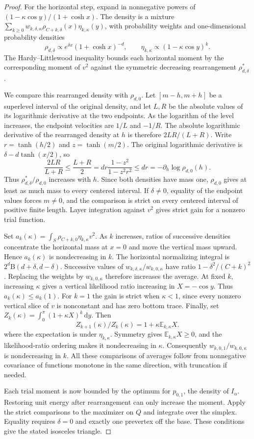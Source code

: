 \documentclass[11pt,a4paper,reqno]{amsart}
\theoremstyle{remark}
\numberwithin{equation}{section}
\newcommand{\dd}{\,\mathrm d}
\begin{document}
\begin{proof}
For the horizontal step, expand in nonnegative powers of
$(1-\kappa\cos y)/(1+\cosh x)$. The density is a mixture
$\sum_{k\ge0}w_{k,\delta,\kappa}\rho_{C+k,\delta}(x)\eta_{k,\kappa}(y)$,
with probability weights and one-dimensional probability densities
\[
 \rho_{d,\delta}\propto e^{\delta x}(1+\cosh x)^{-d},\qquad
 \eta_{k,\kappa}\propto(1-\kappa\cos y)^k .
\]
The Hardy--Littlewood inequality bounds each horizontal moment by the
corresponding moment of $v^2$ against the symmetric decreasing rearrangement
$\rho_{d,\delta}^*$.

We compare this rearranged density with $\rho_{d,0}$. Let $[m-h,m+h]$ be a
superlevel interval of the original density, and let $L,R$ be the absolute
values of its logarithmic derivative at the two endpoints. As the logarithm
of the level increases, the endpoint velocities are $1/L$ and $-1/R$.
The absolute logarithmic derivative of the rearranged density at $h$ is
therefore $2LR/(L+R)$. Write $r=\tanh(h/2)$ and $z=\tanh(m/2)$. The
original logarithmic derivative is $\delta-d\tanh(x/2)$, so
\[
 \frac{2LR}{L+R}\le\frac{L+R}{2}
 =dr\frac{1-z^2}{1-z^2r^2}\le dr
 =-\partial_h\log\rho_{d,0}(h).
\]
Thus $\rho_{d,\delta}^*/\rho_{d,0}$ increases with $h$. Since both
densities have mass one, $\rho_{d,0}$ gives at least as much mass to every
centered interval. If $\delta\ne0$, equality of the endpoint values forces
$m\ne0$, and the comparison is strict on every centered interval of positive
finite length. Layer integration against $v^2$ gives strict gain for a
nonzero trial function.

Set $a_k(\kappa)=\int_S\rho_{C+k,0}\eta_{k,\kappa}v^2$. As $k$ increases,
ratios of successive densities concentrate the horizontal mass at $x=0$ and
move the vertical mass upward. Hence $a_k(\kappa)$ is nondecreasing in $k$.
The horizontal normalizing integral is $2^d\mathrm B(d+\delta,d-\delta)$.
Successive values of $w_{k,\delta,\kappa}/w_{k,0,\kappa}$ have ratio
$1-\delta^2/(C+k)^2$. Replacing the weights by $w_{k,0,\kappa}$ therefore
increases the average. At fixed $k$, increasing $\kappa$ gives a vertical
likelihood ratio increasing in $X=-\cos y$. Thus $a_k(\kappa)\le a_k(1)$.
For $k=1$ the gain is strict when $\kappa<1$, since every nonzero vertical
slice of $v$ is nonconstant and has zero bottom trace. Finally, set
$Z_k(\kappa)=\int_0^\pi(1+\kappa X)^k\dd y$. Then
\[
 Z_{k+1}(\kappa)/Z_k(\kappa)=1+\kappa\mathbb E_{k,\kappa}X .
\]
where the expectation is under $\eta_{k,\kappa}$. Symmetry gives
$\mathbb E_{k,\kappa}X\ge0$, and the likelihood-ratio ordering makes it
nondecreasing in $\kappa$. Consequently $w_{k,0,1}/w_{k,0,\kappa}$ is
nondecreasing in $k$. All these comparisons of averages follow from
nonnegative covariance of functions monotone in the same direction, with
truncation if needed.

Each trial moment is now bounded by the optimum for $p_{0,1}$, the density
of $I_\alpha$. Restoring unit energy after rearrangement can only increase
the moment. Apply the strict comparisons to the maximizer on $Q$ and
integrate over the simplex. Equality requires $\delta=0$ and exactly one
prevertex off the base. These conditions give the stated isosceles triangle.
\end{proof}
\end{document}
